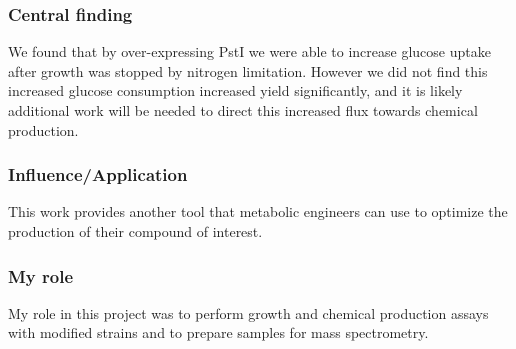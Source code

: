 \documentclass{article}
\begin{document}
\subsubsection{Central finding}
We found that by over-expressing PstI we were able to increase glucose uptake after growth was stopped by nitrogen limitation. 
However we did not find this increased glucose consumption increased yield significantly, and it is likely additional work will be needed to direct this increased flux towards chemical production.
%
\subsubsection{Influence/Application}
This work provides another tool that metabolic engineers can use to optimize the production of their compound of interest.
%
\subsubsection{My role}
My role in this project was to perform growth and chemical production assays with modified strains and to prepare samples for mass spectrometry.
%
\nocite{Chubukov2017-uu}
\printbibliography[heading=none]
\end{document}
